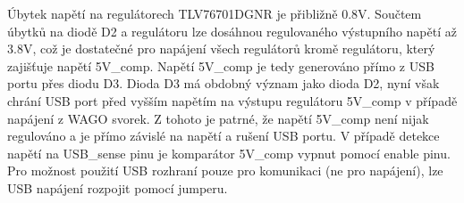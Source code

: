     Úbytek napětí na regulátorech TLV76701DGNR je přibližně 0.8V.
    Součtem úbytků na diodě D2 a regulátoru lze 
    dosáhnou regulovaného výstupního napětí až 3.8V, což je dostatečné pro napájení všech regulátorů
    kromě regulátoru, který zajišťuje napětí 5V\_comp. Napětí 5V\_comp je tedy generováno přímo z USB portu přes 
    diodu D3. Dioda D3 má obdobný význam jako dioda D2, nyní však chrání USB port před vyšším napětím na výstupu
    regulátoru 5V\_comp v případě napájení z WAGO svorek. Z tohoto je patrné, že napětí 5V\_comp není nijak regulováno
    a je přímo závislé na napětí a rušení USB portu.
    V případě detekce napětí na USB\_sense pinu je komparátor 5V\_comp vypnut pomocí enable pinu.\\

    Pro možnost použití USB rozhraní pouze pro komunikaci (ne pro napájení),
    lze USB napájení rozpojit pomocí jumperu.\\

    







